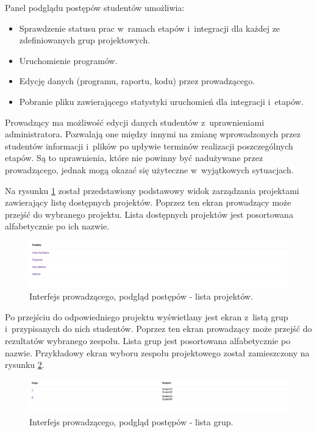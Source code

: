 Panel podglądu postępów studentów umożliwia:
\begin {itemize}
    \item Sprawdzenie statusu prac w~ramach etapów i~integracji dla każdej ze zdefiniowanych grup projektowych.
    \item Uruchomienie programów.
    \item Edycję danych (programu, raportu, kodu) przez prowadzącego.
    \item Pobranie pliku zawierającego statystyki uruchomień dla integracji i~etapów.
\end {itemize}

Prowadzący ma możliwość edycji danych studentów z~uprawnieniami administratora.
Pozwalają one między innymi na zmianę wprowadzonych przez studentów informacji i~plików po upływie terminów realizacji poszczególnych etapów.
Są to uprawnienia, które nie powinny być nadużywane przez prowadzącego, jednak mogą okazać się użyteczne w~wyjątkowych sytuacjach.

Na rysunku \ref{fig:lecturer_preview_projects_list} został przedstawiony podstawowy widok zarządzania projektami zawierający listę dostępnych projektów.
Poprzez ten ekran prowadzący może przejść do wybranego projektu.
Lista dostępnych projektów jest posortowana alfabetycznie po ich nazwie.

\begin{figure}[h]
    \centering
    \includegraphics[width = 16cm]{chapter04/lecturer_preview_projects_list.png}
    \caption{Interfejs prowadzącego, podgląd postępów - lista projektów.}
    \label{fig:lecturer_preview_projects_list}
\end{figure}

Po przejściu do odpowiedniego projektu wyświetlany jest ekran z~listą grup i~przypisanych do nich studentów.
Poprzez ten ekran prowadzący może przejść do rezultatów wybranego zespołu.
Lista grup jest posortowana alfabetycznie po nazwie.
Przykładowy ekran wyboru zespołu projektowego został zamieszczony na rysunku \ref{fig:lecturer_preview_groups}.

\begin{figure}[h]
    \centering
    \includegraphics[width = 16cm]{chapter04/lecturer_preview_groups.png}
    \caption{Interfejs prowadzącego, podgląd postępów - lista grup.}
    \label{fig:lecturer_preview_groups}
\end{figure}

